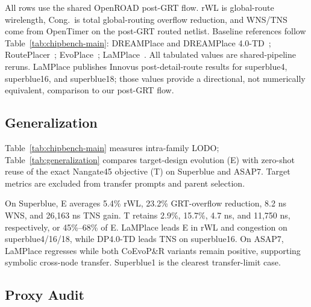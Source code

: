 \begin{table}[!htbp]
{\begin{tabular}{llccccccccccc}
\bottomrule
\end{tabular}
}
\vspace{1pt}
\parbox{\columnwidth}{\scriptsize
All rows use the shared OpenROAD post-GRT flow. rWL is global-route
wirelength, Cong.\ is total global-routing overflow reduction, and WNS/TNS
come from OpenTimer on the post-GRT routed netlist.
Baseline references follow Table~\ref{tab:chipbench-main}: DREAMPlace and
DREAMPlace 4.0-TD~\cite{dreamplace,dreamplace4};
RoutePlacer~\cite{routeplacer}; EvoPlace~\cite{evoplace};
LaMPlace~\cite{lamplace}. All tabulated values are shared-pipeline reruns.
LaMPlace publishes Innovus post-detail-route results for superblue4,
superblue16, and superblue18; those values provide a directional, not
numerically equivalent, comparison to our post-GRT flow.}
\end{table}

\subsection{Generalization}
\label{sec:generalization}

Table~\ref{tab:chipbench-main} measures intra-family LODO; Table~\ref{tab:generalization}
compares target-design evolution (E) with zero-shot reuse of the exact
Nangate45 objective (T) on Superblue and ASAP7. Target metrics are excluded
from transfer prompts and parent selection.

On Superblue, E averages 5.4\% rWL, 23.2\% GRT-overflow reduction, 8.2 ns WNS,
and 26,163 ns TNS gain. T retains 2.9\%, 15.7\%, 4.7 ns, and 11,750 ns,
respectively, or 45\%--68\% of E. LaMPlace leads E in rWL and congestion on
superblue4/16/18, while DP4.0-TD leads TNS on superblue16. On ASAP7,
LaMPlace regresses while both CoEvoP\&R variants remain positive, supporting
symbolic cross-node transfer. Superblue1 is the clearest transfer-limit case.

\subsection{Proxy Audit}

\begin{table}[!htbp]
\caption{Timing-proxy admission audit on the four-design stress panel.
Perturbations use 100, 250, 500, 1000, and 2000 DBU. Thresholds follow
Section~\ref{sec:proxy-audit}; Influence reports the policy after the routed
agreement gate.}
\label{tab:proxy-audit}
\centering
\scriptsize
\setlength{\tabcolsep}{1.5pt}
\end{table}

